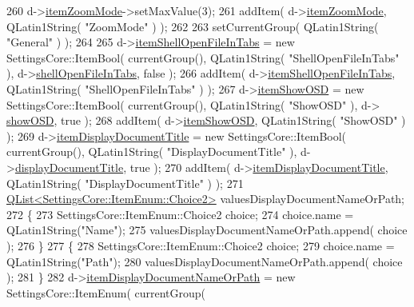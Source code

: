 \begin{DoxyCode}
260   d->\hyperlink{classOkular_1_1SettingsPrivate_a63b3fe05c0719de0f94cfbab41d4f52e}{itemZoomMode}->setMaxValue(3);
261   addItem( d->\hyperlink{classOkular_1_1SettingsPrivate_a63b3fe05c0719de0f94cfbab41d4f52e}{itemZoomMode}, QLatin1String( \textcolor{stringliteral}{"ZoomMode"} ) );
262 
263   setCurrentGroup( QLatin1String( \textcolor{stringliteral}{"General"} ) );
264 
265   d->\hyperlink{classOkular_1_1SettingsPrivate_a7f0d51eecbcf19e89af1b8fe777873e3}{itemShellOpenFileInTabs} = \textcolor{keyword}{new} SettingsCore::ItemBool( currentGroup(), 
      QLatin1String( \textcolor{stringliteral}{"ShellOpenFileInTabs"} ), d->\hyperlink{classOkular_1_1SettingsPrivate_ac73c4b9cc99b0dc6db98a6904d7640c9}{shellOpenFileInTabs}, \textcolor{keyword}{false} );
266   addItem( d->\hyperlink{classOkular_1_1SettingsPrivate_a7f0d51eecbcf19e89af1b8fe777873e3}{itemShellOpenFileInTabs}, QLatin1String( \textcolor{stringliteral}{"ShellOpenFileInTabs"} ) );
267   d->\hyperlink{classOkular_1_1SettingsPrivate_a27f1970c3866f47ce57e6652f0ac0a44}{itemShowOSD} = \textcolor{keyword}{new} SettingsCore::ItemBool( currentGroup(), QLatin1String( \textcolor{stringliteral}{"ShowOSD"} ), d->
      \hyperlink{classOkular_1_1SettingsPrivate_a345bba4c3b0a87f52cb0b01dc023c754}{showOSD}, \textcolor{keyword}{true} );
268   addItem( d->\hyperlink{classOkular_1_1SettingsPrivate_a27f1970c3866f47ce57e6652f0ac0a44}{itemShowOSD}, QLatin1String( \textcolor{stringliteral}{"ShowOSD"} ) );
269   d->\hyperlink{classOkular_1_1SettingsPrivate_a77ac0114dc2afc51a248c5facd23f992}{itemDisplayDocumentTitle} = \textcolor{keyword}{new} SettingsCore::ItemBool( currentGroup(), 
      QLatin1String( \textcolor{stringliteral}{"DisplayDocumentTitle"} ), d->\hyperlink{classOkular_1_1SettingsPrivate_a6a8c4abf8094c77e469831b6e0d4b2ea}{displayDocumentTitle}, \textcolor{keyword}{true} );
270   addItem( d->\hyperlink{classOkular_1_1SettingsPrivate_a77ac0114dc2afc51a248c5facd23f992}{itemDisplayDocumentTitle}, QLatin1String( \textcolor{stringliteral}{"DisplayDocumentTitle"} ) );
271   \hyperlink{classQList}{QList<SettingsCore::ItemEnum::Choice2>} 
      valuesDisplayDocumentNameOrPath;
272   \{
273     SettingsCore::ItemEnum::Choice2 choice;
274     choice.name = QLatin1String(\textcolor{stringliteral}{"Name"});
275     valuesDisplayDocumentNameOrPath.append( choice );
276   \}
277   \{
278     SettingsCore::ItemEnum::Choice2 choice;
279     choice.name = QLatin1String(\textcolor{stringliteral}{"Path"});
280     valuesDisplayDocumentNameOrPath.append( choice );
281   \}
282   d->\hyperlink{classOkular_1_1SettingsPrivate_a4010969bd67d27abbe14bad23b7ed77f}{itemDisplayDocumentNameOrPath} = \textcolor{keyword}{new} SettingsCore::ItemEnum( currentGroup(

\end{DoxyCode}
